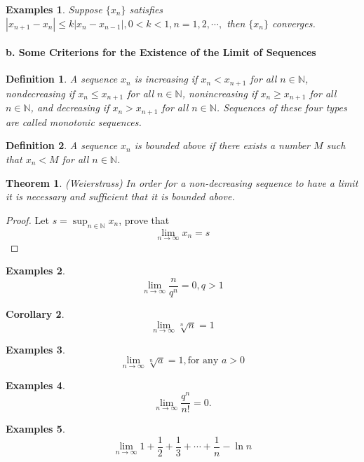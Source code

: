 \documentclass[a4paper,12pt]{article} %
\newtheorem{definition}{Definition}[section]
\newtheorem{theorem}{Theorem}[section]
\newtheorem{corollary}[theorem]{Corollary}
\newtheorem{example}{Examples}
\begin{document}
\begin{example}
    Suppose $\{x_n\}$ satisfies $\displaystyle |x_{n+1} - x_{n}| \le k|x_n - x_{n-1}
    |, 0 < k < 1, n=1,2,\cdots,$
    then $\{x_n\}$ converges.
\end{example}

\paragraph{{\rm \textbf{b. Some Criterions for the Existence of the Limit 
of Sequences}}}
\begin{definition}
    A sequence ${x_n}$ is increasing if $x_n < x_{n+1}$ for all $n \in \mathbb{N}$,
    nondecreasing if $x_n \le x_{n+1}$ for all $n \in \mathbb{N}$,
    nonincreasing if $x_n \ge x_{n+1}$ for all $n \in \mathbb{N}$, and 
    decreasing if $x_n > x_{n+1}$ for all $n \in \mathbb{N}$.
    Sequences of these four types are called monotonic sequences.
\end{definition}
\begin{definition}
    A sequence ${x_n}$ is bounded above if there exists a number $M$
    such that $x_n < M$ for all $n \in \mathbb{N}$.
\end{definition}
\begin{theorem}{(Weierstrass)}
    In order for a non-decreasing sequence to have a limit it is 
    necessary and sufficient that it is bounded above.
\end{theorem}
\begin{proof}
    Let $s = \sup_{n\in \mathbb{N}}x_n$, prove that 
    \[\lim_{n \to \infty}x_n = s \]
\end{proof}

\begin{example}
    \[\lim_{n \to \infty} \frac{n}{q^n} = 0, q>1\]
\end{example}
\begin{corollary}
    \[\lim_{n \to \infty} \sqrt[n]{n} = 1\]
\end{corollary}

\begin{example}
    \[\lim_{n \to \infty} \sqrt[n]{a} = 1,\text{for any } a>0\]
\end{example}

\begin{example}
    \[
        \lim_{n \to \infty} \frac{q^n}{n!} = 0.
        \]
\end{example}
\begin{example}
    \[\lim_{n \to \infty} 1+\frac{1}{2}+\frac{1}{3}+\cdots+\frac{1}{n}-\ln n \]
\end{example}
\end{document}

